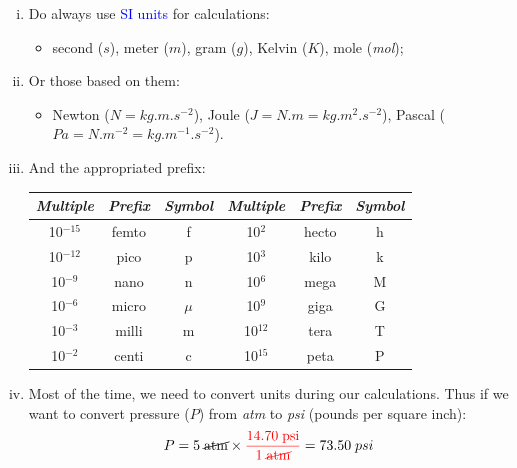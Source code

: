 \documentclass[12pts,a4paper,amsmath,amssymb,floatfix]{article}%
\newcommand{\blue}{\textcolor{blue}}
\begin{document}
\begin{enumerate}[(i)]
%
   \item Do always use \blue{SI units} for calculations:
       \begin{itemize}
          \item second ($s$), meter ($m$), gram ($g$), Kelvin ($K$), mole ({\it mol});
       \end{itemize}
%
   \item Or those based on them:
       \begin{itemize}
          \item Newton ($N=kg.m.s^{-2}$), Joule ($J=N.m=kg.m^{2}.s^{-2}$), Pascal ($Pa=N.m^{-2}=kg.m^{-1}.s^{-2}$).
       \end{itemize}
%
   \item And the appropriated prefix:
      \begin{center}
        \begin{tabular}{c c c | c c c}
             \hline
             {\it Multiple} & {\it Prefix} & {\it Symbol} & {\it Multiple} & {\it Prefix} & {\it Symbol} \\
             \hline
             10$^{-15}$      & femto        & f            &   10$^{2}$     &  hecto       & h            \\
             10$^{-12}$      & pico         & p            &   10$^{3}$     &  kilo        & k            \\
             10$^{-9}$       & nano         & n            &   10$^{6}$     &  mega        & M            \\
             10$^{-6}$       & micro        & $\mu$        &   10$^{9}$     &  giga        & G            \\
             10$^{-3}$       & milli        & m            &   10$^{12}$    &  tera        & T            \\
             10$^{-2}$       & centi        & c            &   10$^{15}$    &  peta        & P            \\
             \hline
        \end{tabular}
      \end{center}
%
   \item Most of the time, we need to convert units during our calculations. Thus if we want to convert pressure ($P$) from {\it atm} to {\it psi} (pounds per square inch):
      \begin{displaymath}
        P = 5\;\cancel{\text{atm}} \times \textcolor{red}{\displaystyle\frac{14.70\;\text{psi}}{1\;\cancel{\text{atm}}}} = 73.50\;psi

\end{displaymath}
\end{enumerate}
\end{document}
